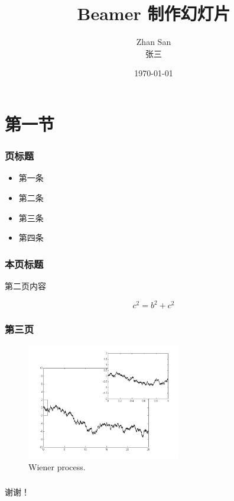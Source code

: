 \documentclass{beamer}
\author{Zhan San\\张三}
\date{\today}
\institute{XXX University}
\title{Beamer 制作幻灯片}
\begin{document}
\maketitle

\section{第一节}

\begin{frame}
    \frametitle{页标题}

    \begin{itemize}
        \item 第一条 \pause
        \item \alert{第二条} \pause
        \item 第三条
        \item 第四条
    \end{itemize}

\end{frame}

\begin{frame}
    \frametitle{本页标题}

    第二页内容
    \begin{theorem}[勾股定理]
        $$c^2 = b^2 + c^2$$
    \end{theorem}

\end{frame}

\begin{frame}
    \frametitle{第三页}
    \begin{figure}
        \centering
        \includegraphics[width=0.6\textwidth]{Wiener_process_zoom.png}

        \caption{Wiener process.}
        \label{}
    \end{figure}
    
\end{frame}

\begin{frame}
    \frametitle{}
    \centering
    谢谢！
\end{frame}
\end{document}
